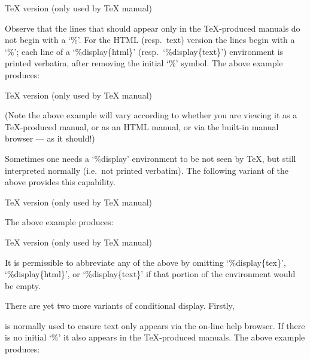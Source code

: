 \begintt
TeX version (only used by TeX manual)
\endtt

Observe that the lines that should appear  only  in  the  {\TeX}-produced
manuals do not begin with a `\%'. For the HTML (resp.~text)  version  the
lines  begin  with  a  `\%';   each   line   of   a   `\%display\{html\}'
(resp.~`\%display\{text\}')  environment  is  printed   verbatim,   after
removing the initial `\%' symbol. The above example produces:

TeX version (only used by TeX manual)

(Note the above example will vary according to whether you are viewing it
as a {\TeX}-produced manual,  or as an HTML manual,  or via the  built-in
manual browser --- as it should!)

Sometimes one needs a `\%display' environment to be not seen  by  {\TeX},
but still interpreted normally (i.e.~not printed verbatim). The following
variant of the above provides this capability.

\begintt
TeX version (only used by TeX manual)
\endtt

The above example produces:

TeX version (only used by TeX manual)

It  is  permissible  to  abbreviate  any  of  the   above   by   omitting
`\%display\{tex\}', `\%display\{html\}', or `\%display\{text\}'  if  that
portion of the environment would be empty.

There are yet two more variants of conditional display. Firstly,

\begintt
\endtt

is normally used to  ensure  text  only  appears  via  the  on-line  help
browser.  If  there  is  no  initial  `\%'  it  also   appears   in   the
{\TeX}-produced manuals. The above example produces:



